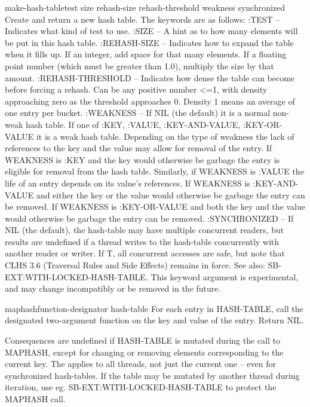 \begin{function}{make-hash-table}{\key test size rehash-size rehash-threshold weakness synchronized}{}{}
  Create and return a new hash table. The keywords are as follows:
     :TEST -- Indicates what kind of test to use.
     :SIZE -- A hint as to how many elements will be put in this hash
       table.
     :REHASH-SIZE -- Indicates how to expand the table when it fills up.
       If an integer, add space for that many elements. If a floating
       point number (which must be greater than 1.0), multiply the size
       by that amount.
     :REHASH-THRESHOLD -- Indicates how dense the table can become before
       forcing a rehash. Can be any positive number <=1, with density
       approaching zero as the threshold approaches 0. Density 1 means an
       average of one entry per bucket.
     :WEAKNESS -- If NIL (the default) it is a normal non-weak hash table.
       If one of :KEY, :VALUE, :KEY-AND-VALUE, :KEY-OR-VALUE it is a weak
       hash table.
       Depending on the type of weakness the lack of references to the
       key and the value may allow for removal of the entry. If WEAKNESS
       is :KEY and the key would otherwise be garbage the entry is eligible
       for removal from the hash table. Similarly, if WEAKNESS is :VALUE
       the life of an entry depends on its value's references. If WEAKNESS
       is :KEY-AND-VALUE and either the key or the value would otherwise be
       garbage the entry can be removed. If WEAKNESS is :KEY-OR-VALUE and
       both the key and the value would otherwise be garbage the entry can
       be removed.
     :SYNCHRONIZED -- If NIL (the default), the hash-table may have
       multiple concurrent readers, but results are undefined if a
       thread writes to the hash-table concurrently with another
       reader or writer. If T, all concurrent accesses are safe, but
       note that CLHS 3.6 (Traversal Rules and Side Effects) remains
       in force. See also: SB-EXT:WITH-LOCKED-HASH-TABLE. This keyword
       argument is experimental, and may change incompatibly or be
       removed in the future.
\end{function}

\begin{function}{maphash}{function-designator hash-table}{}{}
  For each entry in HASH-TABLE, call the designated two-argument function on
the key and value of the entry. Return NIL.

Consequences are undefined if HASH-TABLE is mutated during the call to
MAPHASH, except for changing or removing elements corresponding to the
current key. The applies to all threads, not just the current one --
even for synchronized hash-tables. If the table may be mutated by
another thread during iteration, use eg. SB-EXT:WITH-LOCKED-HASH-TABLE
to protect the MAPHASH call.
\end{function}

